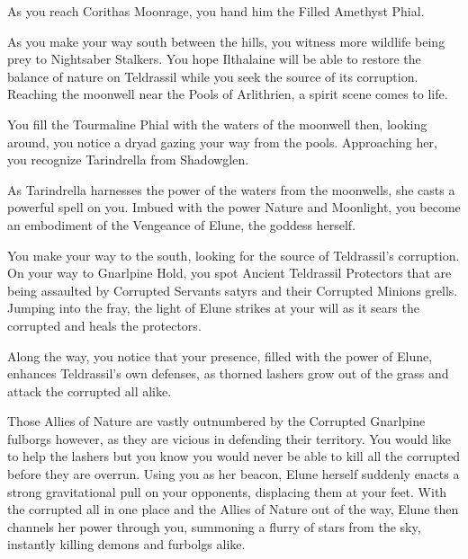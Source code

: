 As you reach Corithas Moonrage, you hand him the Filled Amethyst Phial.



As you make your way south between the hills, you witness more wildlife being prey to Nightsaber Stalkers. You hope Ilthalaine will be able to restore the balance of nature on Teldrassil while you seek the source of its corruption. Reaching the moonwell near the Pools of Arlithrien, a spirit scene comes to life.


You fill the Tourmaline Phial with the waters of the moonwell then, looking around, you notice a dryad gazing your way from the pools. Approaching her, you recognize Tarindrella from Shadowglen.




As Tarindrella harnesses the power of the waters from the moonwells, she casts a powerful spell on you. Imbued with the power Nature and Moonlight, you become an embodiment of the Vengeance of Elune, the goddess herself.

You make your way to the south, looking for the source of Teldrassil's corruption. On your way to Gnarlpine Hold, you spot Ancient Teldrassil Protectors that are being assaulted by Corrupted Servants satyrs and their Corrupted Minions grells. Jumping into the fray, the light of Elune strikes at your will as it sears the corrupted and heals the protectors.

Along the way, you notice that your presence, filled with the power of Elune, enhances Teldrassil's own defenses, as thorned lashers grow out of the grass and attack the corrupted all alike.

Those Allies of Nature are vastly outnumbered by the Corrupted Gnarlpine fulborgs however, as they are vicious in defending their territory. You would like to help the lashers but you know you would never be able to kill all the corrupted before they are overrun. Using you as her beacon, Elune herself suddenly enacts a strong gravitational pull on your opponents, displacing them at your feet. With the corrupted all in one place and the Allies of Nature out of the way, Elune then channels her power through you, summoning a flurry of stars from the sky, instantly killing demons and furbolgs alike.

